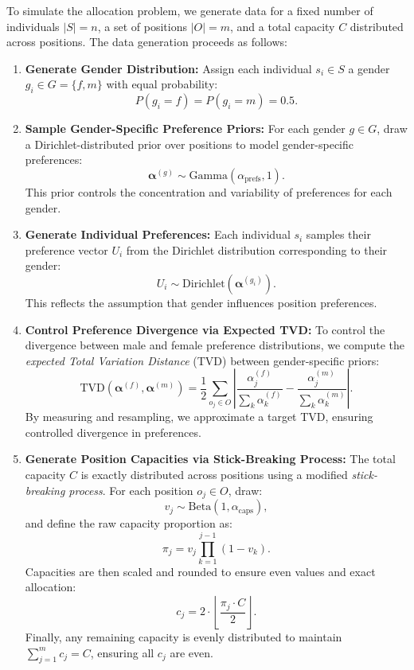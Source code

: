 \documentclass[letterpaper]{article}
\begin{document}
To simulate the allocation problem, we generate data for a fixed number of individuals \( |S| = n \), a set of positions \( |O| = m \), and a total capacity \( C \) distributed across positions. The data generation proceeds as follows:

\begin{enumerate}
    \item \textbf{Generate Gender Distribution:}  
    Assign each individual \( s_i \in S \) a gender \( g_i \in G = \{f, m\} \) with equal probability:
    \[
    P(g_i = f) = P(g_i = m) = 0.5.
    \]

    \item \textbf{Sample Gender-Specific Preference Priors:}  
    For each gender \( g \in G \), draw a Dirichlet-distributed prior over positions to model gender-specific preferences:
    \[
    \boldsymbol{\alpha}^{(g)} \sim \text{Gamma}(\alpha_\text{prefs}, 1).
    \]
    This prior controls the concentration and variability of preferences for each gender.

    \item \textbf{Generate Individual Preferences:}  
    Each individual \( s_i \) samples their preference vector \( U_i \) from the Dirichlet distribution corresponding to their gender:
    \[
    U_i \sim \text{Dirichlet}(\boldsymbol{\alpha}^{(g_i)}).
    \]
    This reflects the assumption that gender influences position preferences.

    \item \textbf{Control Preference Divergence via Expected TVD:}  
    To control the divergence between male and female preference distributions, we compute the \textit{expected Total Variation Distance} (TVD) between gender-specific priors:
    \[
    \text{TVD}(\boldsymbol{\alpha}^{(f)}, \boldsymbol{\alpha}^{(m)}) = \frac{1}{2} \sum_{o_j \in O} \left| \frac{\alpha^{(f)}_j}{\sum_{k} \alpha^{(f)}_k} - \frac{\alpha^{(m)}_j}{\sum_{k} \alpha^{(m)}_k} \right|.
    \]
    By measuring and resampling, we approximate a target TVD, ensuring controlled divergence in preferences.

    \item \textbf{Generate Position Capacities via Stick-Breaking Process:}  
    The total capacity \( C \) is exactly distributed across positions using a modified \textit{stick-breaking process}. For each position \( o_j \in O \), draw:
    \[
    v_j \sim \text{Beta}(1, \alpha_\text{caps}),
    \]
    and define the raw capacity proportion as:
    \[
    \pi_j = v_j \prod_{k=1}^{j-1} (1 - v_k).
    \]
    Capacities are then scaled and rounded to ensure even values and exact allocation:
    \[
    c_j = 2 \cdot \left\lfloor \frac{\pi_j \cdot C}{2} \right\rfloor.
    \]
    Finally, any remaining capacity is evenly distributed to maintain \( \sum_{j=1}^m c_j = C \), ensuring all \( c_j \) are even.
\end{enumerate}
\end{document}
